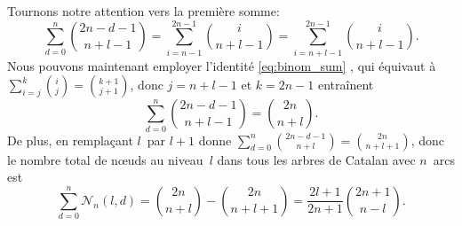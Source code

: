 Tournons notre attention vers la première somme:
\begin{equation*}
\sum_{d=0}^{n}\binom{2n-d-1}{n+l-1}
  = \sum_{i=n-1}^{2n-1}\binom{i}{n+l-1}
  = \sum_{i=n+l-1}^{2n-1}\binom{i}{n+l-1}.
\end{equation*}
Nous pouvons maintenant employer l'identité \eqref{eq:binom_sum}
, qui équivaut à \(\sum_{i=j}^{k}\binom{i}{j} =
\binom{k+1}{j+1}\), donc \(j=n+l-1\) et \(k=2n-1\) entraînent
\begin{equation*}
\sum_{d=0}^{n}\binom{2n-d-1}{n+l-1} = \binom{2n}{n+l}.
\end{equation*}
De plus, en remplaçant \(l\)~par \(l+1\) donne
\(\sum_{d=0}^{n}\binom{2n-d-1}{n+l} = \binom{2n}{n+l+1}\), donc le
nombre total de n{\oe}uds au niveau~\(l\) dans tous les arbres de
Catalan avec \(n\)~arcs est
\begin{equation}
\sum_{d=0}^{n}\mathcal{N}_n(l,d)
 = \binom{2n}{n+l} - \binom{2n}{n+l+1}
 = \frac{2l+1}{2n+1}\binom{2n+1}{n-l}.
\label{eq:N_n_l_d}
\end{equation}

